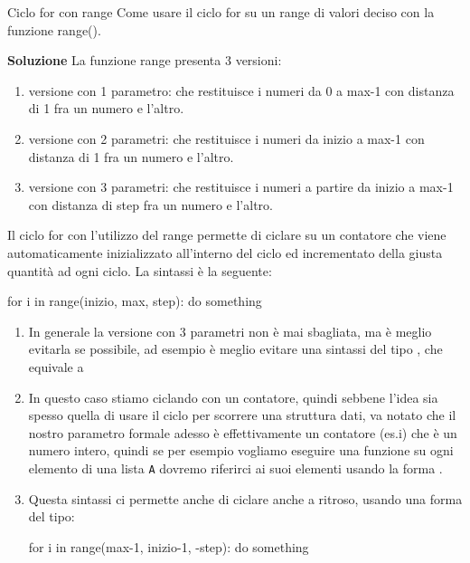 \documentclass[10pt]{article}
\makeatletter
\newcommand{\<}{\langle}
\renewcommand{\>}{\rangle}
\renewenvironment{proof}[1][\proofname] {\par\pushQED{\qed}
\renewcommand*{\proofname}{Soluzione}
{\normalfont\sffamily\bfseries\topsep6\p@\@plus6\p@\relax #1\@addpunct{.} }}{\popQED\endtrivlist\@endpefalse}
\theoremstyle{mystyle}{\newtheorem*{remark}{Nota}}
\theoremstyle{mystyle}{\newtheorem*{remarks}{Note}}
\theoremstyle{mystyle}{\newtheorem*{example}{Esempio}}
\theoremstyle{mystyle}{\newtheorem*{examples}{Esempi}}
\theoremstyle{definition}{\newtheorem*{exercise}{Exercise}}
\theoremstyle{warn}
\makeatother
\begin{document}
\begin{definition}{Ciclo for con range}{}
Come usare il ciclo for su un range di valori deciso con la funzione range().
\end{definition}
\begin{proof}
La funzione range presenta 3 versioni:
\begin{enumerate}
    \item versione con 1 parametro:  che restituisce i numeri da 0 a max-1 con distanza di 1 fra un numero e l'altro.
    \item versione con 2 parametri:  che restituisce i numeri da inizio a max-1 con distanza di 1 fra un numero e l'altro.
    \item versione con 3 parametri:  che restituisce i numeri a partire da inizio a max-1 con distanza di step fra un numero e l'altro.
\end{enumerate}
Il ciclo for con l'utilizzo del range permette di ciclare su un contatore che viene automaticamente inizializzato all'interno del ciclo ed incrementato della giusta quantità ad ogni ciclo. La sintassi è la seguente:
\begin{python}
for i in range(inizio, max, step):
    do something
\end{python}
\end{proof}
\begin{remarks} \leavevmode
\begin{enumerate}
    \item In generale la versione con 3 parametri non è mai sbagliata, ma è meglio  evitarla se possibile, ad esempio è meglio evitare una sintassi del tipo , che equivale a 
    \item In questo caso stiamo ciclando con un contatore, quindi sebbene l'idea sia spesso quella di usare il ciclo per scorrere una struttura dati, va notato che il nostro parametro formale adesso è effettivamente un contatore (es.i) che è un numero intero, quindi se per esempio vogliamo eseguire una funzione su ogni elemento di una lista \texttt{A} dovremo riferirci ai suoi elementi usando la forma .
    \item Questa sintassi ci permette anche di ciclare anche a ritroso, usando una forma del tipo:
    \begin{python}
for i in range(max-1, inizio-1, -step):
    do something
    \end{python}
\end{enumerate}
\end{remarks}
\end{document}
